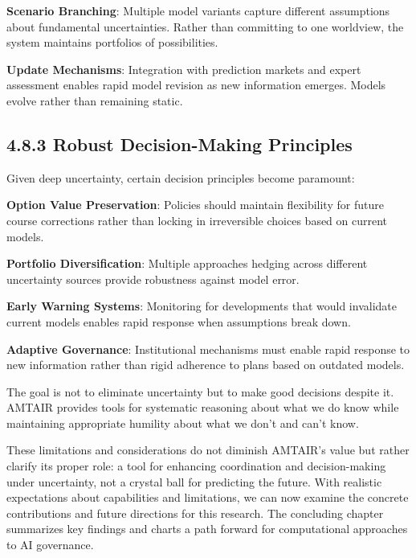\documentclass[
  11pt,
  letterpaper,
]{book}
\begin{document}
\textbf{Scenario Branching}: Multiple model variants capture different
assumptions about fundamental uncertainties. Rather than committing to
one worldview, the system maintains portfolios of possibilities.

\textbf{Update Mechanisms}: Integration with prediction markets and
expert assessment enables rapid model revision as new information
emerges. Models evolve rather than remaining static.

\subsection*{4.8.3 Robust Decision-Making
Principles}\label{sec-robust-principles}

Given deep uncertainty, certain decision principles become paramount:

\textbf{Option Value Preservation}: Policies should maintain flexibility
for future course corrections rather than locking in irreversible
choices based on current models.

\textbf{Portfolio Diversification}: Multiple approaches hedging across
different uncertainty sources provide robustness against model error.

\textbf{Early Warning Systems}: Monitoring for developments that would
invalidate current models enables rapid response when assumptions break
down.

\textbf{Adaptive Governance}: Institutional mechanisms must enable rapid
response to new information rather than rigid adherence to plans based
on outdated models.

The goal is not to eliminate uncertainty but to make good decisions
despite it. AMTAIR provides tools for systematic reasoning about what we
do know while maintaining appropriate humility about what we don't and
can't know.

These limitations and considerations do not diminish AMTAIR's value but
rather clarify its proper role: a tool for enhancing coordination and
decision-making under uncertainty, not a crystal ball for predicting the
future. With realistic expectations about capabilities and limitations,
we can now examine the concrete contributions and future directions for
this research. The concluding chapter summarizes key findings and charts
a path forward for computational approaches to AI governance.

\end{document}
